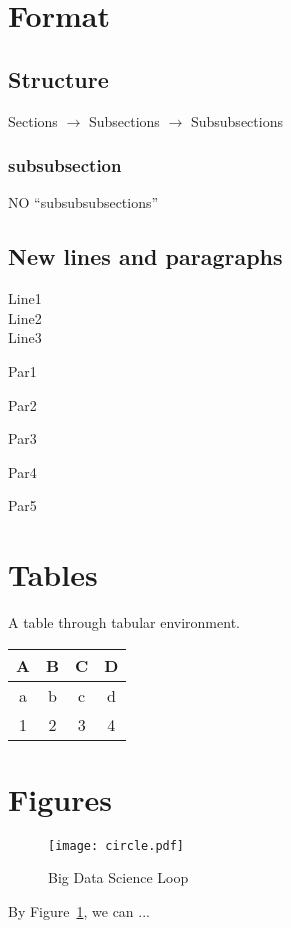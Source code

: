\documentclass[11pt]{article}
\theoremstyle{mytheoremstyle}
\begin{document}
\section{Format}
\subsection{Structure}
Sections $\longrightarrow$ Subsections $\longrightarrow$ Subsubsections

\subsubsection{subsubsection}

NO ``subsubsubsections''

\subsection{New lines and paragraphs}
Line1\\
Line2\\
Line3

Par1

Par2

Par3

\noindent Par4

\vspace{0.2in}
Par5


\section{Tables}
A table through {\color{blue}tabular} environment.
\begin{table}[h]
\centering
\begin{tabular}{c|c|c|c}
\hline A & B & C & D\\
\hline a &b &c &d\\
\hline 1 &2 & 3 &4\\
\hline
\end{tabular}
\end{table}

\section{Figures}

\begin{figure}[h]
  \centerline{\texttt{[image: circle.pdf]}}
  \caption{Big Data Science Loop}
  \label{circle}
\end{figure}

By Figure~\ref{circle}, we can ... 
\end{document}
